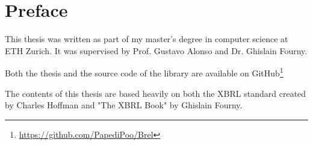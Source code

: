\chapter{Preface}

This thesis was written as part of my master's degree in computer science at ETH Zurich.
It was supervised by Prof. Gustavo Alonso and Dr. Ghislain Fourny.

Both the thesis and the source code of the library are available on GitHub\footnote{\url{https://github.com/PapediPoo/Brel}}

The contents of this thesis are based heavily on both the XBRL standard\cite{xbrl} created by Charles Hoffman and "The XBRL Book"\cite{fourny2023xbrl} by Ghislain Fourny.